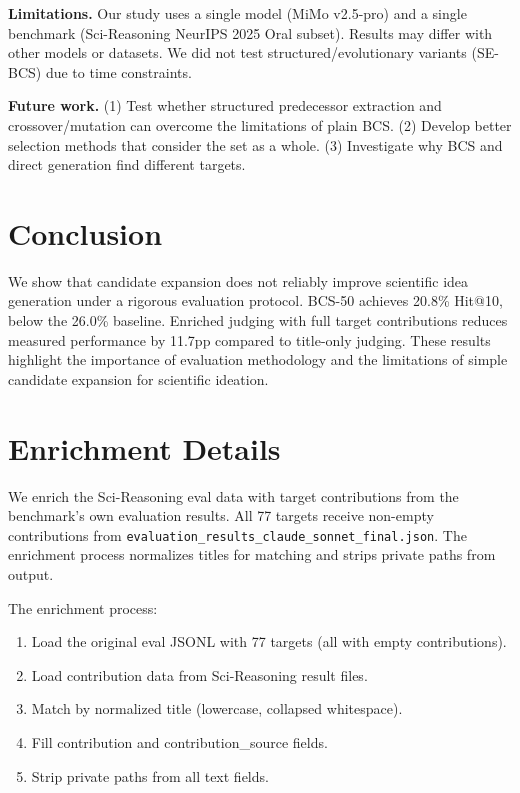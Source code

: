 \documentclass[wcp]{jmlr}
\begin{document}
\textbf{Limitations.} Our study uses a single model (MiMo v2.5-pro) and a single benchmark (Sci-Reasoning NeurIPS 2025 Oral subset). Results may differ with other models or datasets. We did not test structured/evolutionary variants (SE-BCS) due to time constraints.

\textbf{Future work.} (1) Test whether structured predecessor extraction and crossover/mutation can overcome the limitations of plain BCS. (2) Develop better selection methods that consider the set as a whole. (3) Investigate why BCS and direct generation find different targets.

\section{Conclusion}\label{sec:conclusion}

We show that candidate expansion does not reliably improve scientific idea generation under a rigorous evaluation protocol. BCS-50 achieves 20.8\% Hit@10, below the 26.0\% baseline. Enriched judging with full target contributions reduces measured performance by 11.7pp compared to title-only judging. These results highlight the importance of evaluation methodology and the limitations of simple candidate expansion for scientific ideation.


%


\appendix

\section{Enrichment Details}\label{apd:enrichment}

We enrich the Sci-Reasoning eval data with target contributions from the benchmark's own evaluation results. All 77 targets receive non-empty contributions from \texttt{evaluation\_results\_claude\_sonnet\_final.json}. The enrichment process normalizes titles for matching and strips private paths from output.

The enrichment process:
\begin{enumerate}
\item Load the original eval JSONL with 77 targets (all with empty contributions).
\item Load contribution data from Sci-Reasoning result files.
\item Match by normalized title (lowercase, collapsed whitespace).
\item Fill contribution and contribution\_source fields.
\item Strip private paths from all text fields.
\end{enumerate}
\end{document}
